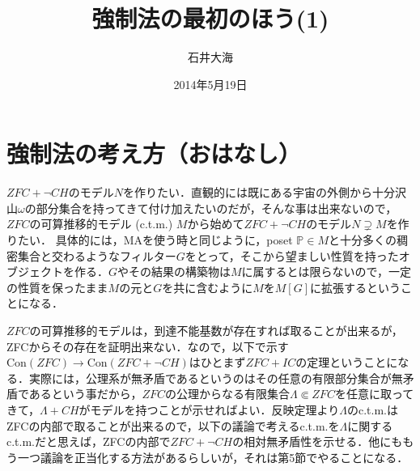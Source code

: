 \documentclass[a4j]{bxjsarticle}
\title{強制法の最初のほう(1)}
\author{石井大海}
\date{2014年5月19日}
\newcommand{\Con}{\mathrm{Con}}
\begin{document}
\maketitle
\section{強制法の考え方（おはなし）}
$ZFC + \neg CH$のモデル$N$を作りたい．直観的には既にある宇宙の外側から十分沢山$\omega$の部分集合を持ってきて付け加えたいのだが，そんな事は出来ないので，$ZFC$の可算推移的モデル (c.t.m.) $M$から始めて$ZFC+\neg CH$のモデル$N \supsetneq M$を作りたい．
具体的には，MAを使う時と同じように，poset $\mathbb{P} \in M$と十分多くの稠密集合と交わるようなフィルター$G$をとって，そこから望ましい性質を持ったオブジェクトを作る．$G$やその結果の構築物は$M$に属するとは限らないので，一定の性質を保ったまま$M$の元と$G$を共に含むように$M$を$M[G]$に拡張するということになる．

$ZFC$の可算推移的モデルは，到達不能基数が存在すれば取ることが出来るが，ZFCからその存在を証明出来ない．なので，以下で示す$\Con(ZFC) \rightarrow \Con(ZFC+\neg CH)$はひとまず$ZFC+IC$の定理ということになる．実際には，公理系が無矛盾であるというのはその任意の有限部分集合が無矛盾であるという事だから，$ZFC$の公理からなる有限集合$\Lambda \Subset ZFC$を任意に取ってきて，$\Lambda + CH$がモデルを持つことが示せればよい．反映定理より$\Lambda$のc.t.m.はZFCの内部で取ることが出来るので，以下の議論で考えるc.t.m.を$\Lambda$に関するc.t.m.だと思えば，ZFCの内部で$ZFC+\neg CH$の相対無矛盾性を示せる．他にももう一つ議論を正当化する方法があるらしいが，それは第5節でやることになる．
\end{document}
